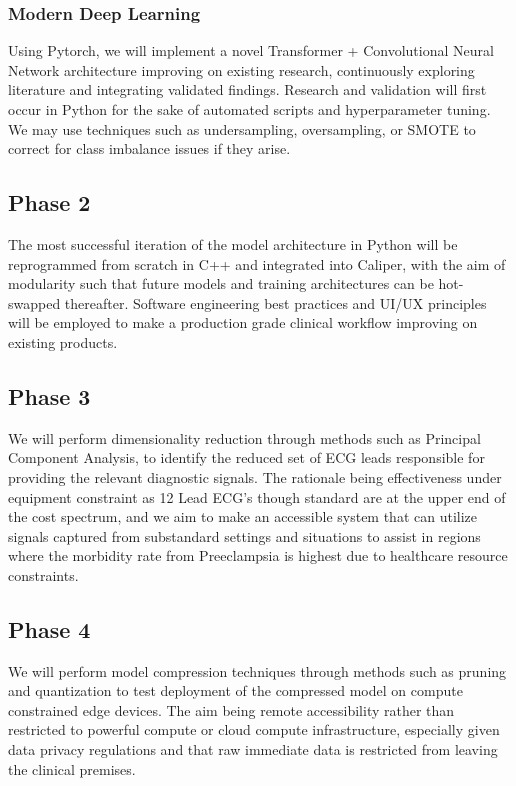 \documentclass[sigconf,nonacm]{acmart}
\begin{document}
\subsubsection{Modern Deep Learning}
Using Pytorch, we will implement a novel Transformer + Convolutional Neural Network architecture improving on existing research, continuously exploring literature and integrating validated findings. Research and validation will first occur in Python for the sake of automated scripts and hyperparameter tuning. We may use techniques such as undersampling, oversampling, or SMOTE to correct for class imbalance issues if they arise.

  \subsection{Phase 2}
The most successful iteration of the model architecture in Python will be reprogrammed from scratch in C++ and integrated into Caliper, with the aim of modularity such that future models and training architectures can be hot-swapped thereafter. Software engineering best practices and UI/UX principles will be employed to make a production grade clinical workflow improving on existing products.

  \subsection{Phase 3}
We will perform dimensionality reduction through methods such as Principal Component Analysis, to identify the reduced set of ECG leads responsible for providing the relevant diagnostic signals. The rationale being effectiveness under equipment constraint as 12 Lead ECG's though standard are at the upper end of the cost spectrum, and we aim to make an accessible system that can utilize signals captured from substandard settings and situations to assist in regions where the morbidity rate from Preeclampsia is highest due to healthcare resource constraints.

  \subsection{Phase 4}
We will perform model compression techniques through methods such as pruning and quantization to test deployment of the compressed model on compute constrained edge devices. The aim being remote accessibility rather than restricted to powerful compute or cloud compute infrastructure, especially given data privacy regulations and that raw immediate data is restricted from leaving the clinical premises.
\end{document}
